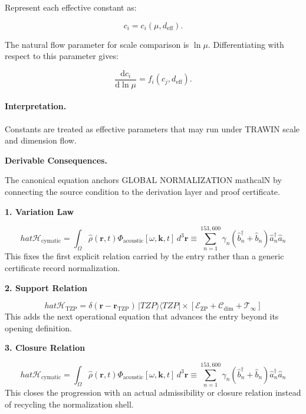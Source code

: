 Represent each effective constant as:

\begin{equation}
c_i=c_i(\mu,d_{\mathrm{eff}}).
\end{equation}

The natural flow parameter for scale comparison is $\ln\mu$.  
Differentiating with respect to this parameter gives:

\begin{equation}
\boxed{
\frac{\mathrm{d}c_i}{\mathrm{d}\ln\mu}
=
f_i(c_j,d_{\mathrm{eff}}).
}
\end{equation}

\paragraph{Interpretation.}
Constants are treated as effective parameters that may run under TRAWIN scale and dimension flow.

\par\vspace{0.35em}
\noindent\textbf{Derivable Consequences.}\quad
\begingroup
\footnotesize
\raggedright
The canonical equation anchors GLOBAL NORMALIZATION mathcalN by connecting the source condition to the derivation layer and proof certificate.
\par\endgroup

\noindent\textbf{1. Variation Law}\par
\[
hat{\mathcal{H}}_{\text{cymatic}} = \int_{\Omega} \hat{\rho}(\mathbf{r}, t) \Phi_{\text{acoustic}}[\omega, \mathbf{k}, t] \, d^3\mathbf{r} \equiv \sum_{n=1}^{153,600} \gamma_n (\hat{b}_n^\dagger + \hat{b}_n) \hat{a}_n^\dagger \hat{a}_n
\]
\noindent This fixes the first explicit relation carried by the entry rather than a generic certificate record normalization.\par
\noindent\textbf{2. Support Relation}\par
\[
hat{\mathcal{H}}_{\text{TZP}} = \delta(\mathbf{r} - \mathbf{r}_{\text{TZP}}) \, |TZP\rangle\langle TZP| \times \left[ \mathcal{E}_{\text{ZP}} + \mathcal{C}_{\text{dim}} + \mathcal{T}_{\infty} \right]
\]
\noindent This adds the next operational equation that advances the entry beyond its opening definition.\par
\noindent\textbf{3. Closure Relation}\par
\[
hat{\mathcal{H}}_{\text{cymatic}} = \int_{\Omega} \hat{\rho}(\mathbf{r}, t) \Phi_{\text{acoustic}}[\omega, \mathbf{k}, t] \, d^3\mathbf{r} \equiv \sum_{n=1}^{153,600} \gamma_n (\hat{b}_n^\dagger + \hat{b}_n) \hat{a}_n^\dagger \hat{a}_n
\]
\noindent This closes the progression with an actual admissibility or closure relation instead of recycling the normalization shell.\par

